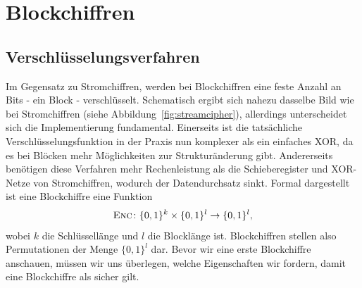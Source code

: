 \section{Blockchiffren}
\label{block}

%

\subsection{Verschlüsselungsverfahren}
Im Gegensatz zu Stromchiffren, werden bei Blockchiffren eine feste Anzahl an Bits - ein Block - verschlüsselt. Schematisch ergibt sich nahezu dasselbe Bild wie bei Stromchiffren (siehe Abbildung~\ref{fig:streamcipher}), allerdings unterscheidet sich die Implementierung fundamental. Einerseits ist die tatsächliche Verschlüsselungsfunktion in der Praxis nun komplexer als ein einfaches XOR, da es bei Blöcken mehr Möglichkeiten zur Strukturänderung gibt. Andererseits benötigen diese Verfahren mehr Rechenleistung als die Schieberegister und XOR-Netze von Stromchiffren, wodurch der Datendurchsatz sinkt.
Formal dargestellt ist eine Blockchiffre eine Funktion
\begin{align*}
	\textsc{Enc} \colon \{0, 1\}^k \times \{0, 1\}^l \rightarrow \{0, 1\}^l,
\end{align*}
wobei \(k\) die Schlüssellänge und \(l\) die Blocklänge ist. Blockchiffren stellen also Permutationen der Menge 
\(\{0, 1\}^l\) dar.
Bevor wir eine erste Blockchiffre anschauen, müssen wir uns überlegen, welche Eigenschaften wir fordern, damit eine Blockchiffre als sicher gilt.

